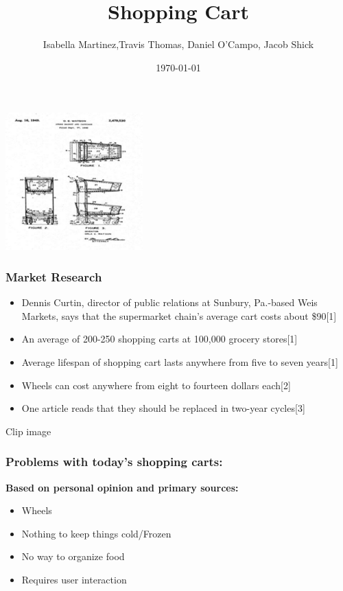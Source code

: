 \documentclass[12pt]{beamer}
\title{Shopping Cart}
\author{Isabella Martinez,Travis Thomas, Daniel O'Campo, Jacob Shick}
\date{\today}
\begin{document}
\begin{frame}
  \titlepage
   \begin{center}
        
        \includegraphics[width=.30\textwidth]{images/test.png}

    \end{center}
  
  
  
\end{frame}

\begin{frame}
  \frametitle{Market Research}
 	\begin{itemize}
        \item{\large Dennis Curtin, director of public relations at Sunbury, Pa.-based Weis Markets, says that the supermarket chain's average cart costs about \$90[1]} 

    \item {\large An average of 200-250 shopping carts at 100,000 grocery stores}[1]

        \item {\large Average lifespan of shopping cart lasts anywhere from five to seven years}[1]

        \item{\large Wheels can cost anywhere from eight to fourteen dollars each}[2]
        \item { \large One article reads that they should be replaced in two-year cycles}[3]

    \end{itemize}
\end{frame}
\begin{frame}{Clip image}
\frametitle{Problems with today's shopping carts:  }
\vspace{-1cm}
\textbf{Based on personal opinion and primary sources: }\\
\vspace{.2cm}
\begin{itemize}
      \item {\LARGE Wheels}
        \item { \LARGE Nothing to keep  things cold/Frozen}
        \item {\LARGE No way to organize food}
        \item {\LARGE Requires user interaction} 
    \end{itemize}
\end{frame}
\end{document}
